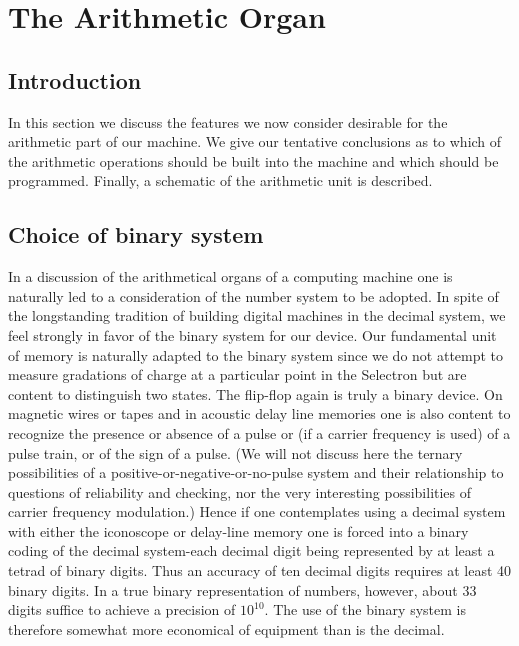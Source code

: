 \documentclass[12pt]{amsart}
\begin{document}
\section{The Arithmetic Organ}

\subsection{Introduction}
In this section we discuss the features we now consider desirable for the arithmetic part of our machine. We give our tentative conclusions as to which of the arithmetic operations should be built into the machine and which should be programmed. Finally, a schematic of the arithmetic unit is described.

\subsection{Choice of binary system}
In a discussion of the arithmetical organs of a computing machine one is naturally led to a consideration of the number system to be adopted. In spite of the longstanding tradition of building digital machines in the decimal system, we feel strongly in favor of the binary system for our device. Our fundamental unit of memory is naturally adapted to the binary system since we do not attempt to measure gradations of charge at a particular point in the Selectron but are content to distinguish two states. The flip-flop again is truly a binary device. On magnetic wires or tapes and in acoustic delay line memories one is also content to recognize the presence or absence of a pulse or (if a carrier frequency is used) of a pulse train, or of the sign of a pulse. (We will not discuss here the ternary possibilities of a positive-or-negative-or-no-pulse system and their relationship to questions of reliability and checking, nor the very interesting possibilities of carrier frequency modulation.) Hence if one contemplates using a decimal system with either the iconoscope or delay-line memory one is forced into a binary coding of the decimal system-each decimal digit being represented by at least a tetrad of binary digits. Thus an accuracy of ten decimal digits requires at least 40 binary digits. In a true binary representation of numbers, however, about 33 digits suffice to achieve a precision of $10^{10}$. The use of the binary system is therefore somewhat more economical of equipment than is the decimal.
\end{document}
